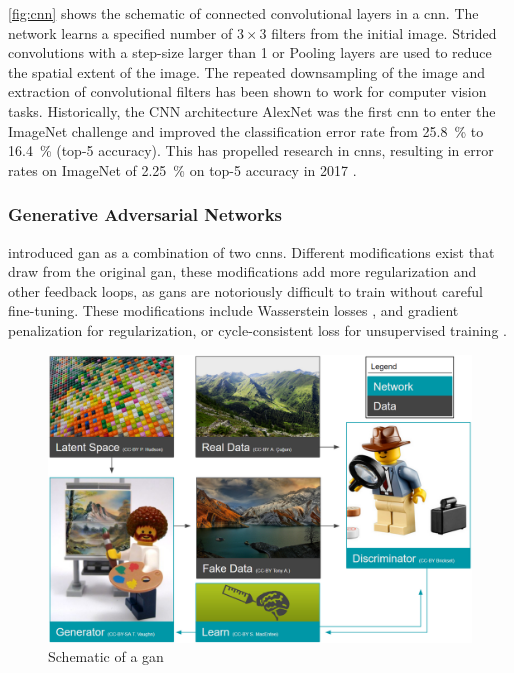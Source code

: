 \cref{fig:cnn} shows the schematic of connected convolutional layers in a \ac{cnn}. The network learns a specified number of $3\times3$ filters from the initial image. Strided convolutions with a step-size larger than 1 or Pooling layers are used to reduce the spatial extent of the image. The repeated downsampling of the image and extraction of convolutional filters has been shown to work for computer vision tasks. Historically, the CNN architecture AlexNet \citep{krizhevsky2012imagenet} was the first \ac{cnn} to enter the ImageNet challenge and improved the classification error rate from 25.8~\% to 16.4~\% (top-5 accuracy). This has propelled research in \acp{cnn}, resulting in error rates on ImageNet of 2.25~\% on top-5 accuracy in 2017 \citep{imagenetresults}.

\subsubsection{Generative Adversarial Networks}
\citet{Goodfellow2014-ax} introduced \acf{gan} as a combination of two \acp{cnn}. Different modifications exist that draw from the original \ac{gan}, these modifications add more regularization and other feedback loops, as \acp{gan} are notoriously difficult to train without careful fine-tuning. These modifications include Wasserstein losses \citep{arjovsky2017wasserstein}, and gradient penalization \citep{gulrajani2017improved} for regularization, or cycle-consistent loss for unsupervised training \citep{zhu2017unpaired}.

\begin{figure}[H]
    \centering
    \includegraphics[width=\textwidth]{figures/GAN.PNG}
    \caption{Schematic of a \acl{gan}}
    \label{fig:gan}
\end{figure}

